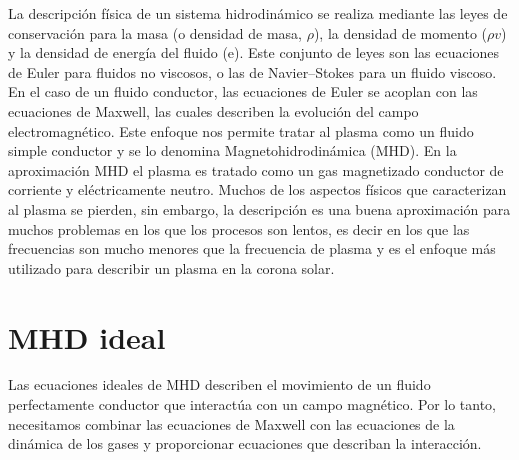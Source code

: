 \documentclass[a4paper,11pt]{report}
\begin{document}
La descripción física de un sistema hidrodinámico se realiza mediante las leyes de conservación para la masa (o densidad de masa, $\rho$), la densidad de momento ($\rho v$) y la densidad de energía del fluido (e). Este conjunto de leyes son las ecuaciones de Euler para fluidos no viscosos, o las de Navier–Stokes para un fluido viscoso. En el caso de un fluido conductor, las ecuaciones de Euler se acoplan con las ecuaciones de Maxwell, las cuales describen la evolución del campo electromagnético. Este enfoque nos permite tratar al plasma como un fluido simple conductor y se lo denomina Magnetohidrodinámica (MHD). En la aproximación MHD el plasma es tratado como un gas magnetizado conductor de corriente y eléctricamente neutro. Muchos de los aspectos físicos que caracterizan al plasma se pierden, sin embargo, la descripción es una buena aproximación para muchos problemas en los que los procesos son lentos, es decir en los que las frecuencias son mucho menores que la frecuencia de plasma y es el enfoque más utilizado para describir un plasma en la corona solar. %



\section{MHD ideal}\label{mhd_ideal}

Las ecuaciones ideales de MHD describen el movimiento de un fluido perfectamente conductor que interactúa con un campo magnético. Por lo tanto, necesitamos combinar las ecuaciones de Maxwell con las ecuaciones de la dinámica de los gases y proporcionar ecuaciones que describan la interacción.
\end{document}
